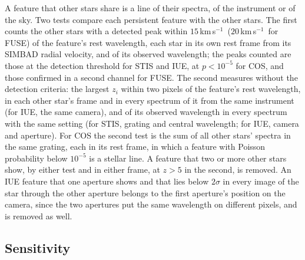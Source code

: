 \documentclass[3p,11pt]{elsarticle}
\newcommand{\kms}{km\,s$^{-1}$}
\begin{document}
A feature that other stars share is a line of their spectra, of the instrument or of the
sky. Two tests compare each persistent feature with the other stars. The first counts the
other stars with a detected peak within $15$\,\kms\ ($20$\,\kms\ for FUSE) of the
feature's rest wavelength, each star in its own rest frame from its SIMBAD radial
velocity, and of its observed wavelength; the peaks counted are those at the detection
threshold for STIS and IUE, at $p<10^{-5}$ for COS, and those confirmed in a second
channel for FUSE. The second measures without the detection criteria: the largest
$z_i$ within two pixels of the feature's rest wavelength, in each other star's frame and
in every spectrum of it from the same instrument (for IUE, the same camera), and of its
observed wavelength in every spectrum with the same setting (for STIS, grating and
central wavelength; for IUE, camera and aperture). For COS the second test is the sum of
all other stars' spectra in the same grating, each in its rest frame, in which a feature
with Poisson probability below $10^{-5}$ is a stellar line. A feature that two or more
other stars show, by either test and in either frame, at $z>5$ in the second, is
removed. An IUE feature that one aperture shows and that lies below $2\sigma$ in every
image of the star through the other aperture belongs to the first aperture's position on
the camera, since the two apertures put the same wavelength on different pixels, and is
removed as well.

\subsection{Sensitivity}\label{sec:sens}
\end{document}
